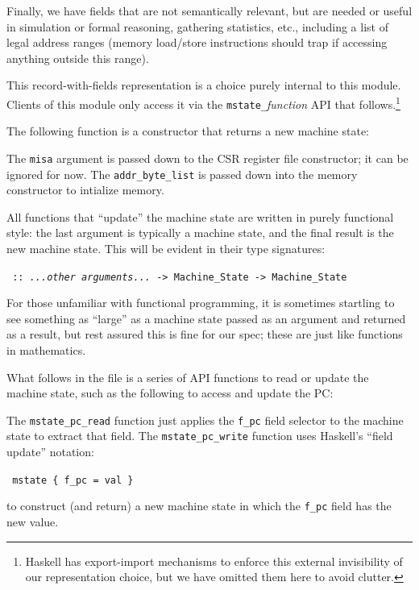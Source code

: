 \documentclass[11pt]{article}
\newcommand{\hmm}{\hspace*{2em}}
\begin{document}
Finally, we have fields that are not semantically relevant, but are
needed or useful in simulation or formal reasoning, gathering
statistics, etc., including a list of legal address ranges (memory
load/store instructions should trap if accessing anything outside this
range).

This record-with-fields representation is a choice purely internal to
this module.  Clients of this module only access it via the
\verb|mstate_|{\it{}function} API that follows.\footnote{Haskell has
export-import mechanisms to enforce this external invisibility of our
representation choice, but we have omitted them here to avoid
clutter.}

The following function is a constructor that returns a new machine state:



The \verb|misa| argument is passed down to the CSR register file
constructor; it can be ignored for now.  The \verb|addr_byte_list| is
passed down into the memory constructor to intialize memory.

All functions that ``update'' the machine state are written in purely
functional style: the last argument is typically a machine state, and
the final result is the new machine state.  This will be evident in
their type signatures:

\begin{tabbing}\tt
\hmm {\it somefunction} :: {\it ...other arguments...} -> Machine\_State -> Machine\_State
\end{tabbing}

For those unfamiliar with functional programming, it is sometimes
startling to see something as ``large'' as a machine state passed as
an argument and returned as a result, but rest assured this is fine
for our spec; these are just like functions in mathematics.

What follows in the file is a series of API functions to read or
update the machine state, such as the following to access and update
the PC:



The \verb|mstate_pc_read| function just applies the \verb|f_pc| field
selector to the machine state to extract that field.  The
\verb|mstate_pc_write| function uses Haskell's ``field update''
notation:

\begin{tabbing}\tt
\hmm \verb|mstate { f_pc = val }|
\end{tabbing}
to construct (and return) a new machine state in which the \verb|f_pc|
field has the new value.
\end{document}
